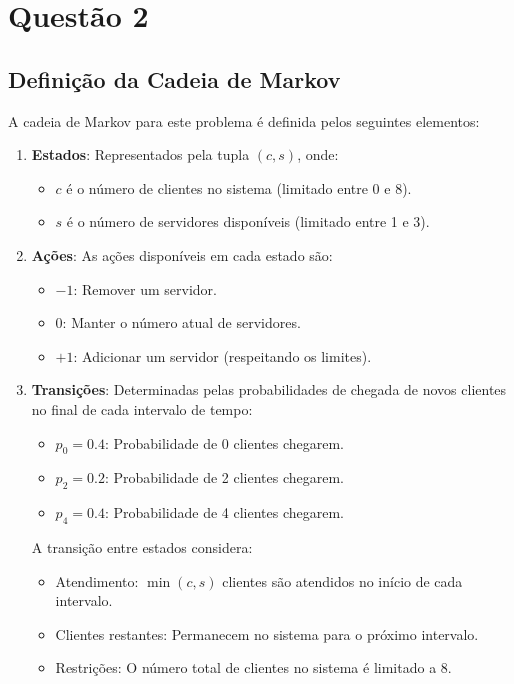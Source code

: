 \section*{Questão 2}

\subsection*{Definição da Cadeia de Markov}

A cadeia de Markov para este problema é definida pelos seguintes elementos:

\begin{enumerate}
    \item \textbf{Estados}: Representados pela tupla $(c, s)$, onde:
    \begin{itemize}
        \item $c$ é o número de clientes no sistema (limitado entre 0 e 8).
        \item $s$ é o número de servidores disponíveis (limitado entre 1 e 3).
    \end{itemize}

    \item \textbf{Ações}: As ações disponíveis em cada estado são:
    \begin{itemize}
        \item $-1$: Remover um servidor.
        \item $0$: Manter o número atual de servidores.
        \item $+1$: Adicionar um servidor (respeitando os limites).
    \end{itemize}

    \item \textbf{Transições}: Determinadas pelas probabilidades de chegada de novos clientes no final de cada intervalo de tempo:
    \begin{itemize}
        \item $p_0 = 0.4$: Probabilidade de 0 clientes chegarem.
        \item $p_2 = 0.2$: Probabilidade de 2 clientes chegarem.
        \item $p_4 = 0.4$: Probabilidade de 4 clientes chegarem.
    \end{itemize}
    A transição entre estados considera:
    \begin{itemize}
        \item Atendimento: $\min(c, s)$ clientes são atendidos no início de cada intervalo.
        \item Clientes restantes: Permanecem no sistema para o próximo intervalo.
        \item Restrições: O número total de clientes no sistema é limitado a 8.
    \end{itemize}


\end{enumerate}
